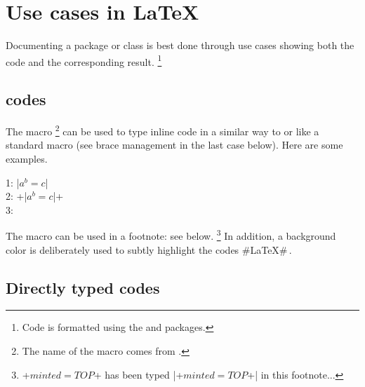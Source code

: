 \documentclass{tutodoc}
\begin{document}
\section{Use cases in \LaTeX}
\label{tutodoc-listing-latex}

Documenting a package or class is best done through use cases showing both the code and the corresponding result.
\footnote{
    Code is formatted using the  and  packages.
}


%


\subsection{ codes}
\label{tutodoc-listing-latex-inline}

The  macro
\footnote{
    The name of the macro  comes from .
}
can be used to type inline code in a similar way to  or like a standard macro (see brace management in the last case below).
Here are some examples.


\begin{tdoclatex}
    1: \tdoclatexin|$a^b = c$|               \\
    2: \tdoclatexin+\tdoclatexin|$a^b = c$|+ \\
    3: 
\end{tdoclatex}


\begin{tdocnote}
    The  macro can be used in a footnote: see below.
    \footnote{
        \tdoclatexin+$minted = TOP$+ has been typed \tdoclatexin|\tdoclatexin+$minted = TOP$+| in this footnote...
    }
    In addition, a background color is deliberately used to subtly highlight the codes \tdoclatexin#\LaTeX#\,.
\end{tdocnote}




\subsection{Directly typed codes}
\end{document}
